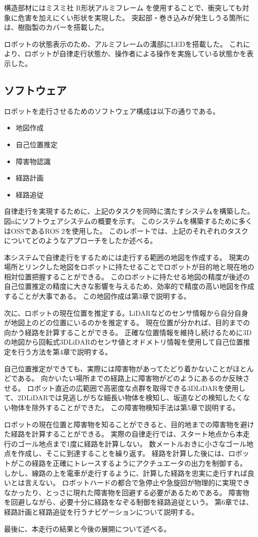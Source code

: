 構造部材にはミスミ社 R形状アルミフレーム を使用することで、衝突しても対象に危害を加えにくい形状を実現した。
突起部・巻き込みが発生しうる箇所には、樹脂製のカバーを搭載した。

ロボットの状態表示のため、アルミフレームの溝部にLEDを搭載した。
これにより、ロボットが自律走行状態か、操作者による操作を実施している状態かを表示した。

\subsection{ソフトウェア}
ロボットを走行させるためのソフトウェア構成は以下の通りである。
\begin{itemize}
    \item 地図作成
    \item 自己位置推定
    \item 障害物認識
    \item 経路計画
    \item 経路追従
\end{itemize}

自律走行を実現するために、上記のタスクを同時に満たすシステムを構築した。
図nにソフトウェアシステムの概要を示す。
このシステムを構築するために多くはOSSであるROS 2を使用した。
このレポートでは、上記のそれぞれのタスクについてどのようなアプローチをしたか述べる。

本システムで自律走行をするためには走行する範囲の地図を作成する。
現実の場所とリンクした地図をロボットに持たせることでロボットが目的地と現在地の相対位置把握することができる。
このロボットに持たせる地図の精度が後述の自己位置推定の精度に大きな影響を与えるため、効率的で精度の高い地図を作成することが大事である。
この地図作成は第3章で説明する。

次に、ロボットの現在位置を推定する。LiDARなどのセンサ情報から自分自身が地図上のどの位置にいるのかを推定する。
現在位置が分かれば、目的までの向かう経路を計算することができる。
正確な位置情報を維持し続けるために3Dの地図から回転式3DLiDARのセンサ値とオドメトリ情報を使用して自己位置推定を行う方法を第4章で説明する。

自己位置推定ができても、実際には障害物があってたどり着かないことがほとんどである。
向かいたい場所までの経路上に障害物がどのようにあるのか反映させる。
ロボット直近の広範囲で高密度な点群を取得できる3DLiDARを使用して、2DLiDARでは見逃しがちな細長い物体を検知し、坂道などの検知したくない物体を除外することができた。
この障害物検知手法は第5章で説明する。

ロボットの現在位置と障害物を知ることができると、目的地までの障害物を避けた経路を計算することができる。
実際の自律走行では、スタート地点から本走行のゴール地点まで1度に経路を計算しない。
数メートルおきに小さなゴール地点を作成し、そこに到達することを繰り返す。
経路を計算した後には、ロボットがこの経路を正確にトレースするようにアクチュエータの出力を制御する。
しかし、線路の上を電車が走行するように、計算した経路を忠実に走行すれば良いとは言えない。
ロボットハードの都合で急停止や急旋回が物理的に実現できなかったり、とっさに現れた障害物を回避する必要があるためである。
障害物を回避しながら、必要十分に経路をなぞる制御を経路追従という。
第6章では、経路計画と経路追従を行うナビゲーションについて説明する。

最後に、本走行の結果と今後の展開について述べる。